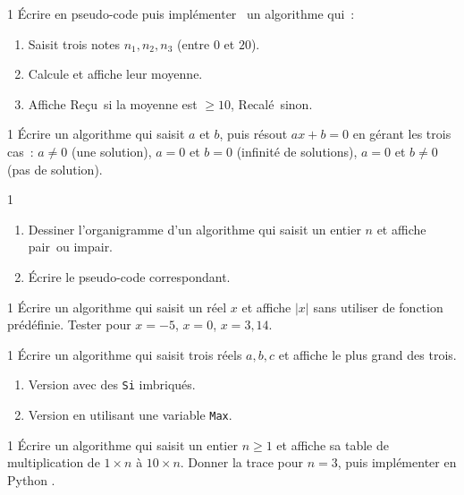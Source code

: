 \begin{exo}{1}
\'Ecrire en pseudo-code puis impl\'ementer \computer\ un algorithme qui~:
\begin{enumerate}
  \item Saisit trois notes $n_1, n_2, n_3$ (entre $0$ et $20$).
  \item Calcule et affiche leur moyenne.
  \item Affiche \og Re\c cu\fg\ si la moyenne est $\geq 10$,
        \og Recal\'e\fg\ sinon.
\end{enumerate}
\end{exo}

\begin{exo}{1}
\'Ecrire un algorithme qui saisit $a$ et $b$, puis r\'esout $ax+b=0$
en g\'erant les trois cas~: $a\ne0$ (une solution), $a=0$ et $b=0$
(infinit\'e de solutions), $a=0$ et $b\ne0$ (pas de solution).
\end{exo}

\begin{exo}{1}
\begin{enumerate}
  \item Dessiner l'organigramme d'un algorithme qui saisit
        un entier $n$ et affiche \og pair\fg\ ou \og impair\fg.
  \item \'Ecrire le pseudo-code correspondant.
\end{enumerate}
\end{exo}

\begin{exo}{1}
\'Ecrire un algorithme qui saisit un r\'eel $x$ et affiche $|x|$
sans utiliser de fonction pr\'ed\'efinie.
Tester pour $x = -5$, $x = 0$, $x = 3{,}14$.
\end{exo}

\begin{exo}{1}
\'Ecrire un algorithme qui saisit trois r\'eels $a, b, c$ et affiche
le plus grand des trois.
\begin{enumerate}
  \item Version avec des \texttt{Si} imbriqu\'es.
  \item Version en utilisant une variable \texttt{Max}.
\end{enumerate}
\end{exo}

\begin{exo}{1}
\'Ecrire un algorithme qui saisit un entier $n \geq 1$ et affiche
sa table de multiplication de $1\times n$ \`a $10\times n$.
Donner la trace pour $n=3$, puis impl\'ementer en Python \computer.
\end{exo}

